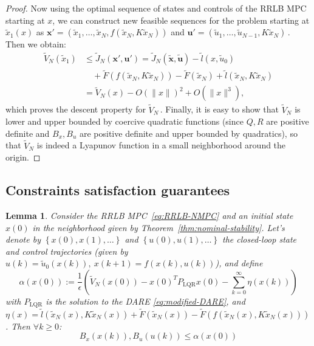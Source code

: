 \documentclass[conference]{IEEEtran}
\newtheorem{lemma}[theorem]{Lemma}
\theoremstyle{definition}
\theoremstyle{remark}
\def\rm#1{\mathrm{#1}}
\def\bf#1{\mathbf{#1}}
\begin{document}
\begin{proof}
	Now using the optimal sequence of states and controls of the RRLB MPC starting at $x$, we can construct new feasible sequences for the problem starting at $\tilde{x}_1(x)$ as
	$\bf{x}'=(\tilde{x}_1,\ldots,\tilde{x}_N,f(\tilde{x}_N,K\tilde{x}_N))$ and $\bf{u}'=(\tilde{u}_1,\ldots,\tilde{u}_{N-1},K\tilde{x}_N)$\,.
	Then we obtain:
	\begin{align*}
		\tilde{V}_N(\tilde{x}_1)&\leq\tilde{J}_N(\bf{x}',\bf{u}')=\tilde{J}_N(\tilde{\bf{x}},\tilde{\bf{u}})-\tilde{l}(x,\tilde{u}_0)\\
		&\quad+\tilde{F}(f(\tilde{x}_N,K\tilde{x}_N))-\tilde{F}(\tilde{x}_N)+\tilde{l}(\tilde{x}_N,K\tilde{x}_N)\\
		&=\tilde{V}_N(x)-O(\|x\|)^2+O(\|x\|^3),
	\end{align*}
	which proves the descent property for $\tilde{V}_N$\,.
	Finally, it is easy to show that $\tilde{V}_N$ is lower and upper bounded by coercive quadratic functions (since $Q,R$ are positive definite and $B_x,B_u$ are positive definite and upper bounded by quadratics), so that $\tilde{V}_N$ is indeed a Lyapunov function in a small neighborhood around the origin.
\end{proof}

\subsection{Constraints satisfaction guarantees}
\label{sec:constraints-satisfaction-guarantees}
\begin{lemma}
	\label{thm:RRLB-bounds-guarantees}
	Consider the RRLB MPC~\ref{eq:RRLB-NMPC} and an initial state $x(0)$ in the neighborhood given by Theorem~\ref{thm:nominal-stability}.
	Let's denote by $\left\{x(0),x(1),\ldots\right\}$ and $\left\{u(0), u(1),\ldots\right\}$ the closed-loop state and control trajectories (given by $u(k)=\tilde{u}_0(x(k)),~x(k+1)=f(x(k),u(k))$), and define 
	\begin{equation*}	
		\alpha(x(0)):=\frac{1}{\epsilon}\left(\tilde{V}_N(x(0))-x(0)^TP_{\rm{LQR}}x(0)-\sum_{k=0}^\infty\eta(x(k))\right)
	\end{equation*}
	with $P_{\rm{LQR}}$ is the solution to the DARE \ref{eq:modified-DARE}, and $\eta(x)=\tilde{l}(\tilde{x}_N(x),K\tilde{x}_N(x))+\tilde{F}(\tilde{x}_N(x))-\tilde{F}(f(\tilde{x}_N(x), K\tilde{x}_N(x)))$.
	Then $\forall k\geq 0$:
	\begin{equation*}
		B_x(x(k)),B_u(u(k))\leq\alpha(x(0))
	\end{equation*}
\end{lemma}
\end{document}
